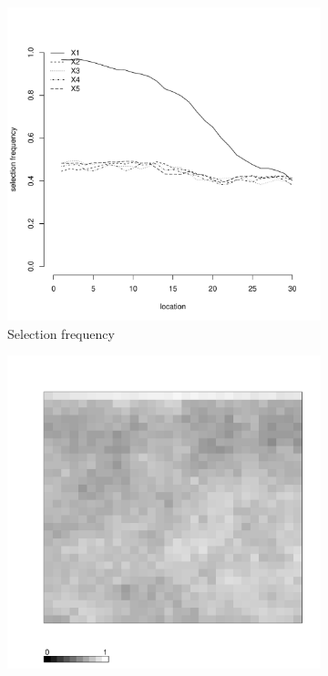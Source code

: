 \documentclass[authoryear, review, 11pt]{elsarticle}
\begin{document}
\begin{figure}
\begin{subfigure}[b]{0.45\textwidth}
		\includegraphics[width=\textwidth]{../../figures/simulation/15.4.profile_selection.pdf}
		\caption{Selection frequency}
	\end{subfigure}
	\begin{subfigure}[b]{0.45\textwidth}
	\centering
		\includegraphics[width=\textwidth]{../../figures/simulation/X1.15.4.unshrunk_bootstrap_coverage.pdf}

\end{subfigure}
\end{figure}
\end{document}

